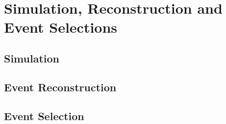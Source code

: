 \chapter{Simulation, Reconstruction and Event Selections}
\label{chap:Selections}

\section{Simulation}
\label{sec:Selections_Simulation}

\section{Event Reconstruction}
\label{sec:Simulation_Reconstruction}

\section{Event Selection}
\label{sec:Selections_Selection}
